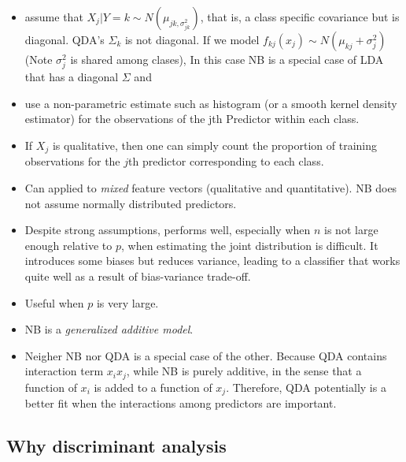 \documentclass[
  letterpaper,
  DIV=11,
  numbers=noendperiod]{scrreprt}
\begin{document}
\begin{itemize}
  \begin{itemize}
  \item
    assume that \(X_j|Y=k \sim N(\mu_{jk,\sigma^2_{jk}})\), that is, a
    class specific covariance but is diagonal. QDA's \(\Sigma_k\) is not
    diagonal. If we model \(f_{kj}(x_j)\sim N(\mu_{kj}+\sigma_j^2)\)
    (Note \(\sigma_j^2\) is shared among clases), In this case NB is a
    special case of LDA that has a diagonal \(\Sigma\) and
  \item
    use a non-parametric estimate such as histogram (or a smooth kernel
    density estimator) for the observations of the jth Predictor within
    each class.
  \item
    If \(X_j\) is qualitative, then one can simply count the proportion
    of training observations for the \(j\)th predictor corresponding to
    each class.
  \item
    Can applied to \emph{mixed} feature vectors (qualitative and
    quantitative). NB does not assume normally distributed predictors.
  \item
    Despite strong assumptions, performs well, especially when \(n\) is
    not large enough relative to \(p\), when estimating the joint
    distribution is difficult. It introduces some biases but reduces
    variance, leading to a classifier that works quite well as a result
    of bias-variance trade-off.
  \item
    Useful when \(p\) is very large.
  \item
    NB is a \emph{generalized additive model}.
  \item
    Neigher NB nor QDA is a special case of the other. Because QDA
    contains interaction term \(x_ix_j\), while NB is purely additive,
    in the sense that a function of \(x_i\) is added to a function of
    \(x_j\). Therefore, QDA potentially is a better fit when the
    interactions among predictors are important.
  \end{itemize}
\end{itemize}

\subsection{Why discriminant analysis}\label{why-discriminant-analysis}
\end{document}
